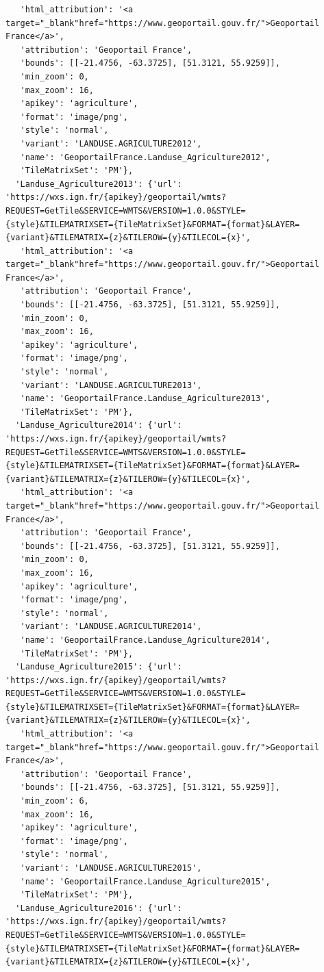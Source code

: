 \documentclass[
  letterpaper,
  DIV=11,
  numbers=noendperiod]{scrreprt}
\begin{document}
\begin{verbatim}
   'html_attribution': '<a target="_blank"href="https://www.geoportail.gouv.fr/">Geoportail France</a>',
   'attribution': 'Geoportail France',
   'bounds': [[-21.4756, -63.3725], [51.3121, 55.9259]],
   'min_zoom': 0,
   'max_zoom': 16,
   'apikey': 'agriculture',
   'format': 'image/png',
   'style': 'normal',
   'variant': 'LANDUSE.AGRICULTURE2012',
   'name': 'GeoportailFrance.Landuse_Agriculture2012',
   'TileMatrixSet': 'PM'},
  'Landuse_Agriculture2013': {'url': 'https://wxs.ign.fr/{apikey}/geoportail/wmts?REQUEST=GetTile&SERVICE=WMTS&VERSION=1.0.0&STYLE={style}&TILEMATRIXSET={TileMatrixSet}&FORMAT={format}&LAYER={variant}&TILEMATRIX={z}&TILEROW={y}&TILECOL={x}',
   'html_attribution': '<a target="_blank"href="https://www.geoportail.gouv.fr/">Geoportail France</a>',
   'attribution': 'Geoportail France',
   'bounds': [[-21.4756, -63.3725], [51.3121, 55.9259]],
   'min_zoom': 0,
   'max_zoom': 16,
   'apikey': 'agriculture',
   'format': 'image/png',
   'style': 'normal',
   'variant': 'LANDUSE.AGRICULTURE2013',
   'name': 'GeoportailFrance.Landuse_Agriculture2013',
   'TileMatrixSet': 'PM'},
  'Landuse_Agriculture2014': {'url': 'https://wxs.ign.fr/{apikey}/geoportail/wmts?REQUEST=GetTile&SERVICE=WMTS&VERSION=1.0.0&STYLE={style}&TILEMATRIXSET={TileMatrixSet}&FORMAT={format}&LAYER={variant}&TILEMATRIX={z}&TILEROW={y}&TILECOL={x}',
   'html_attribution': '<a target="_blank"href="https://www.geoportail.gouv.fr/">Geoportail France</a>',
   'attribution': 'Geoportail France',
   'bounds': [[-21.4756, -63.3725], [51.3121, 55.9259]],
   'min_zoom': 0,
   'max_zoom': 16,
   'apikey': 'agriculture',
   'format': 'image/png',
   'style': 'normal',
   'variant': 'LANDUSE.AGRICULTURE2014',
   'name': 'GeoportailFrance.Landuse_Agriculture2014',
   'TileMatrixSet': 'PM'},
  'Landuse_Agriculture2015': {'url': 'https://wxs.ign.fr/{apikey}/geoportail/wmts?REQUEST=GetTile&SERVICE=WMTS&VERSION=1.0.0&STYLE={style}&TILEMATRIXSET={TileMatrixSet}&FORMAT={format}&LAYER={variant}&TILEMATRIX={z}&TILEROW={y}&TILECOL={x}',
   'html_attribution': '<a target="_blank"href="https://www.geoportail.gouv.fr/">Geoportail France</a>',
   'attribution': 'Geoportail France',
   'bounds': [[-21.4756, -63.3725], [51.3121, 55.9259]],
   'min_zoom': 6,
   'max_zoom': 16,
   'apikey': 'agriculture',
   'format': 'image/png',
   'style': 'normal',
   'variant': 'LANDUSE.AGRICULTURE2015',
   'name': 'GeoportailFrance.Landuse_Agriculture2015',
   'TileMatrixSet': 'PM'},
  'Landuse_Agriculture2016': {'url': 'https://wxs.ign.fr/{apikey}/geoportail/wmts?REQUEST=GetTile&SERVICE=WMTS&VERSION=1.0.0&STYLE={style}&TILEMATRIXSET={TileMatrixSet}&FORMAT={format}&LAYER={variant}&TILEMATRIX={z}&TILEROW={y}&TILECOL={x}',

\end{verbatim}
\end{document}
